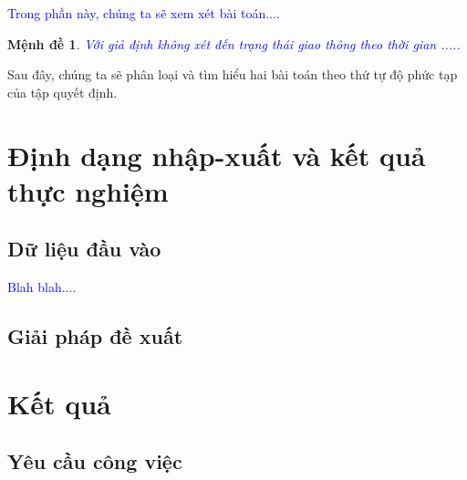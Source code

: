 \documentclass[11pt]{article}
\newtheorem{proposition}{{\bf Mệnh đề}}
\begin{document}
\textcolor{blue}{Trong phần này, chúng ta sẽ xem xét bài toán....}



\begin{proposition}\label{direction}
\textcolor{blue}{Với giả định không xét đến trạng thái giao thông theo thời gian .....}
\end{proposition}


Sau đây, chúng ta sẽ phân loại và tìm hiểu hai bài toán theo thứ tự độ phức tạp của tập quyết định.


%


\section{\texorpdfstring{Định dạng nhập-xuất và kết quả thực nghiệm}{In-out format \& experimentation}}\label{inout}


\subsection{\texorpdfstring{Dữ liệu đầu vào}{Input format}}\label{input}



\textcolor{blue}{Blah blah....}

\subsection{\texorpdfstring{Giải pháp đề xuất}{Proposed approach}}\label{algoPropos}


\section{\texorpdfstring{Kết quả}{Experimental results}}\label{result}


\subsection{\texorpdfstring{Yêu cầu công việc}{Requirement}}\label{mission}
\end{document}
